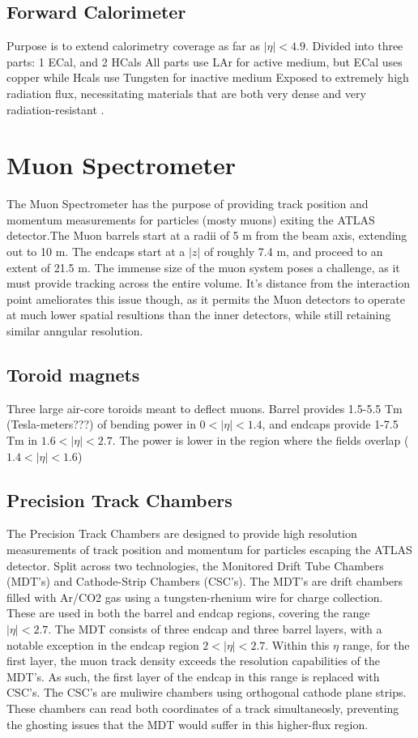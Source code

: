     \subsection{Forward Calorimeter}
        Purpose is to extend calorimetry coverage as far as $|\eta| < 4.9$.
        Divided into three parts: 1 ECal, and 2 HCals
        All parts use LAr for active medium, but ECal uses copper while Hcals use Tungsten for inactive medium
        Exposed to extremely high radiation flux, necessitating materials that are both very dense and very radiation-resistant \cite{Lar_cal_tdr}.



\section{Muon Spectrometer}  %
    The Muon Spectrometer has the purpose of providing track position and momentum measurements for particles (mosty muons) exiting the ATLAS detector.The Muon barrels start at a radii of 5 m from the beam axis, extending out to 10 m. The endcaps start at a $|z|$ of roughly 7.4 m, and proceed to an extent of 21.5 m. The immense size of the muon system poses a challenge, as it must provide tracking across the entire volume. It's distance from the interaction point ameliorates this issue though, as it permits the Muon detectors to operate at much lower spatial resultions than the inner detectors, while still retaining similar anngular resolution.

    \subsection{Toroid magnets}
        Three large air-core toroids meant to deflect muons.
        Barrel provides 1.5-5.5 Tm (Tesla-meters???) of bending power in $0<|\eta|<1.4$,
        and endcaps provide 1-7.5 Tm in $1.6<|\eta|<2.7$.
        The power is lower in the region where the fields overlap ($1.4<|\eta|<1.6$)

    \subsection{Precision Track Chambers}
        The Precision Track Chambers are designed to provide high resolution measurements of track position and momentum for particles escaping the ATLAS detector. Split across two technologies, the Monitored Drift Tube Chambers (MDT's) and Cathode-Strip Chambers (CSC's).
        The MDT's are drift chambers filled with Ar/CO2 gas using a tungsten-rhenium wire for charge collection. These are used in both the barrel and endcap regions, covering the range $|\eta| < 2.7$. The MDT consists of three endcap and three barrel layers, with a notable exception in the endcap region $2 < |\eta| < 2.7$. Within this $\eta$ range, for the first layer, the muon track density exceeds the resolution capabilities of the MDT's. As such, the first layer of the endcap in this range is replaced with CSC's. The CSC's are muliwire chambers using orthogonal cathode plane strips. These chambers can read both coordinates of a track simultaneosly, preventing the ghosting issues that the MDT would suffer in this higher-flux region.

